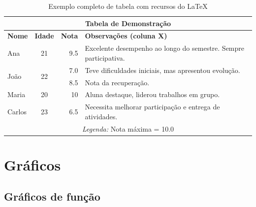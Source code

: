 \documentclass[twoside]{article}
\begin{document}
	\begin{table}[h!]
		\caption{Exemplo completo de tabela com recursos do LaTeX}
		\label{tab:tabela}
		\renewcommand{\arraystretch}{1.4}
	
		\begin{tabularx}{\textwidth}{||l|c|r|X||}
			\hline
			\multicolumn{4}{|c|}{\textbf{Tabela de Demonstração}} \\
			\hline
			\textbf{Nome} & \textbf{Idade} & \textbf{Nota} & \textbf{Observações (coluna X)} \\
			\hline
			Ana & 21 & \cellcolor{ForestGreen} 9.5 & Excelente desempenho ao longo do semestre. Sempre participativa. \\
			\hline
			\multirow{2}{*}{João} & \multirow{2}{*}{22} & 7.0 & Teve dificuldades iniciais, mas apresentou evolução. \\
			& & 8.5 & Nota da recuperação. \\
			\hline
			Maria & 20 & \cellcolor{ForestGreen} 10 & Aluna destaque, liderou trabalhos em grupo. \\
			\hline
			Carlos & 23 & \cellcolor{RedOrange} 6.5 & Necessita melhorar participação e entrega de atividades. \\
			\hline
			\multicolumn{4}{|c|}{\textit{Legenda:} Nota máxima = 10.0} \\
			\hline
		\end{tabularx}
	\end{table}
	
	\lipsum[3]
	
	\section{Gráficos}
	
	\subsection{Gráficos de função}
	
	\begin{center}
	\end{center}
	
\end{document}
